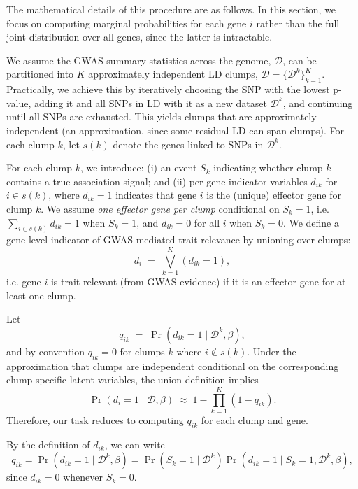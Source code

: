 \documentclass[11pt]{article}
\begin{document}
The mathematical details of this procedure are as follows. In this section,
we focus on computing marginal probabilities for each gene $i$ rather than the
full joint distribution over all genes, since the latter is intractable.

We assume the GWAS summary statistics across the genome, $\mathcal{D}$, can be
partitioned into $K$ approximately independent LD clumps,
$\mathcal{D} = \{\mathcal{D}^k\}_{k=1}^K$. Practically, we achieve this by
iteratively choosing the SNP with the lowest p-value, adding it and all SNPs
in LD with it as a new dataset $\mathcal{D}^k$, and continuing until all SNPs
are exhausted. This yields clumps that are approximately independent (an
approximation, since some residual LD can span clumps). For each clump $k$, let
$s(k)$ denote the genes linked to SNPs in $\mathcal{D}^k$.

For each clump $k$, we introduce:
(i) an event $S_k$ indicating whether clump $k$ contains a true association
signal; and (ii) per-gene indicator variables $d_{ik}$ for $i \in s(k)$,
where $d_{ik}=1$ indicates that gene $i$ is the (unique) effector gene for clump $k$.
We assume \emph{one effector gene per clump} conditional on $S_k=1$, i.e.
$\sum_{i \in s(k)} d_{ik} = 1$ when $S_k=1$, and $d_{ik}=0$ for all $i$ when $S_k=0$.
We define a gene-level indicator of GWAS-mediated trait relevance by unioning
over clumps:
\[
d_i \;=\; \bigvee_{k=1}^K (d_{ik}=1),
\]
i.e. gene $i$ is trait-relevant (from GWAS evidence) if it is an effector gene
for at least one clump.

Let
\[
q_{ik} \;=\; \Pr(d_{ik}=1 \mid \mathcal{D}^k,\beta),
\]
and by convention $q_{ik}=0$ for clumps $k$ where $i \notin s(k)$. Under the
approximation that clumps are independent conditional on the corresponding
clump-specific latent variables, the union definition implies
\begin{equation}
\Pr(d_i=1 \mid \mathcal{D},\beta)
\;\approx\;
1 - \prod_{k=1}^K \left(1 - q_{ik}\right).
\label{eq:combine_sig}
\end{equation}
Therefore, our task reduces to computing $q_{ik}$ for each clump and gene.

By the definition of $d_{ik}$, we can write
\[
q_{ik}
=
\Pr(d_{ik}=1 \mid \mathcal{D}^k,\beta)
=
\Pr(S_k=1 \mid \mathcal{D}^k)\Pr(d_{ik}=1 \mid S_k=1,\mathcal{D}^k,\beta),
\]
since $d_{ik}=0$ whenever $S_k=0$.
\end{document}
